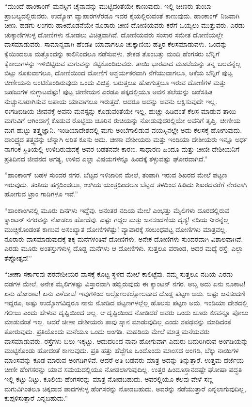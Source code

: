  “ಮುಂದೆ ಹಾಂಕಾಂಗ್ ಮನಸ್ಸಿಗೆ ಚೈನಾವನ್ನು ಮುಟ್ಟಿದಂತೆಯೇ ಕಾಣುವುದು. ಇಲ್ಲಿ ಚೀಣರು ತುಂಬಾ ಪ್ರಾಬಲ್ಯದಲ್ಲಿರುವರು. ಉದ್ಯೋಗ ವ್ಯಾಪಾರಗಳೆರಡೂ ಇವರ ಕೈಯಲ್ಲಿರುವಂತೆ ಕಾಣುವುದು. ಹಾಂಕಾಂಗ್ ನಿಜವಾಗಿ ಚೀಣ. ಹಡಗು ಲಂಗರು ಹಾಕಿದೊಡನೆಯೇ ನೂರಾರು ಚೀಣಿ ದೋಣಿಯವರು ಕರೆಗೆ ಒಯ್ಯಲು ಮುತ್ತುವರು. ಎರಡು ಚುಕ್ಕಾಣಿಗಳುಳ್ಳ ದೋಣಿಗಳು ನೋಡಲು ವಿಚಿತ್ರವಾಗಿವೆ. ದೋಣಿಯವರು ಸಂಸಾರ ಸಮೇತ ದೋಣಿಯಲ್ಲೇ ವಾಸಮಾಡುವರು. ಸಾಮಾನ್ಯವಾಗಿ ಹೆಂಡತಿ ಯಾವಾಗಲೂ ಚುಕ್ಕಾಣಿಯ ಹತ್ತಿರ ಕೆಲಸಮಾಡುವಳು. ಒಂದನ್ನು ಕೈಯಿಂದಲೂ ಮತ್ತೊಂದನ್ನು ಕಾಲಿನಿಂದಲೂ ನಡೆಸುವಳು. ಶೇಕಡ ತೊಂಬತ್ತು ಮಂದಿ ಹೆಂಗಸರು ಬೆನ್ನಿಗೆ ಕೈಕಾಲುಗಳನ್ನು ಇಳಿಬಿಟ್ಟಿರುವ ಮಗುವನ್ನು ಕಟ್ಟಿಕೊಂಡಿರುವರು. ತಾಯಿ ಭಾರವಾದ ಮೂಟೆಯನ್ನು ತನ್ನ ಬಲವನ್ನೆಲ್ಲ ಬಿಟ್ಟು ನೂಕುವಾಗಲೂ, ದೋಣಿಯಿಂದ ದೋಣಿಗೆ ಆಶ್ಚರ್ಯಕರವಾಗಿ ನೆಗೆಯುವಾಗಲೂ, ಆಕೆಯ ಬೆನ್ನಿಗೆ ಪುಟ್ಟ ಚೀಣೀಯನು ಅಂಟಿಕೊಂಡಿರುವುದು ಒಂದು ವಿಚಿತ್ರ. ಬರುತ್ತಲೂ ಹೋಗುತ್ತಲೂ ಇರುವ ದೋಣಿಗಳ ಮತ್ತು ಜಹಜುಗಳ ನುಗ್ಗಾಟವೆಷ್ಟು! ಪುಟ್ಟ ಚೀಣೀಯನ ಎರಡೂ ಪಕ್ಕದಲ್ಲಿಯೂ ಅವನ ತಲೆಯನ್ನು ಜಡೆಸಹಿತ ನುಚ್ಚುನೂರಾಗಿಸುವ ಅಪಾಯ ಯಾವಾಗಲೂ ಇರುತ್ತದೆ. ಆದರೂ ಅದನ್ನು ಅವನು ಲಕ್ಷಿಸುವುದೇ ಇಲ್ಲ. ಈ\break ಗಡಿಬಿಡಿಯ ಜೀವನಕ್ಕೆ ಅವನು ಮನಸ್ಸನ್ನು ಕೊಡುವಂತೆಯೇ ಇಲ್ಲ. ಹುಚ್ಚು ಹಿಡಿದಂತೆ ಕೆಲಸ ಮಾಡುವ ತಾಯಿ ಮಗುವಿಗೆ ಆಗಿಂದಾಗ್ಗೆ ಕೊಡುವ ರೊಟ್ಟಿಯ ಚೂರಿನ ರುಚಿಯನ್ನು ನೋಡುವುದರಲ್ಲಿಯೇ ಅವನಿಗೆ ತೃಪ್ತಿ. ಚೀಣೀಯ ಮಗ ಹುಟ್ಟು ತತ್ತ್ವಜ್ಞಾನಿ. ಇಂಡಿಯಾದೇಶದಲ್ಲಿ ಮಗು ಅಂಬೆಗಾಲಿಡುವ ವಯಸ್ಸಿನಲ್ಲೇ ಅದು ಕೆಲಸಕ್ಕೆ ಹೋಗುವುದು. ದಾರಿದ್ರ್ಯದ ತತ್ತ್ವವನ್ನು ಚೆನ್ನಾಗಿ ಅರಿತ ಕೂಸು ಅದು. ಚೀಣಾ ದೇಶೀಯರು ಮತ್ತು ಇಂಡಿಯಾ ದೇಶೀಯರು ಇನ್ನೂ ಅರ್ಧ ನಾಗರಿಕ ಸ್ಥಿತಿಯಲ್ಲಿ ಉಳಿದಿರುವುದಕ್ಕೆ ಅವರ ಬಡತನವೇ ಕಾರಣ. ಸಾಧಾರಣ ಹಿಂದೂ ಮತ್ತು ಚೀಣೀ ದೇಶೀಯನಿಗೆ ಪ್ರತಿದಿನದ ಜೀವನದ ಅಗತ್ಯ, ಉಳಿದ ಎಲ್ಲಾ ವಿಷಯಗಳನ್ನೂ ಹಿಂದಕ್ಕೆ ತಳ್ಳುವಷ್ಟು ಘೋರವಾಗಿದೆ.” 

”ಹಾಂಕಾಂಗ್ ಬಹಳ ಸುಂದರ ನಗರ. ಬೆಟ್ಟದ ಇಳಿಜಾರಿನ ಮೇಲೆ, ತಂಪಾಗಿ ಇರುವ ಶಿಖರದ ಮೇಲೆ ಪಟ್ಟಣ ಇರುವುದು. ತಂತಿಯ ಹಗ್ಗದಿಂದಲೂ, ಉಗಿಯ ಯಂತ್ರದಿಂದಲೂ ಬೆಟ್ಟದ ತಳದಿಂದ ಹಿಡಿದು ಶಿಖರದವರೆಗೆ ನೇರವಾಗಿ ಹೋಗುವ ಟ್ರಾಂ ಗಾಡಿಗಳೂ ಇವೆ.” 

 “ಹಾಂಕಾಂಗಿನಲ್ಲಿ ಮೂರು ದಿನಗಳು ಇದ್ದೆವು. ಅನಂತರ ನದಿಯ ಮೇಲೆ ಎಂಭತ್ತು ಮೈಲಿಗಳು ದೂರದಲ್ಲಿರುವ ಕ್ಯಾಂಟನ್ ನಗರವನ್ನು ನೋಡಲು ಹೋದೆವು. ಎಷ್ಟು ಗದ್ದಲ ಮತ್ತು ಜನಸಂದಣಿಯ ದೃಶ್ಯ! ನದಿಯ ನೀರನ್ನೆಲ್ಲ ಮುಚ್ಚಿಕೊಂಡಂತೆ ಕಾಣುವ ಅಸಂಖ್ಯಾತ ದೋಣಿಗಳೆಷ್ಟು! ವ್ಯಾಪಾರಕ್ಕೆ ಸಂಬಂಧಪಟ್ಟ ದೋಣಿಗಳು ಮಾತ್ರವಲ್ಲ. ನೂರಾರು ವಾಸಮಾಡುವುದಕ್ಕೆ ತಕ್ಕ ಮನೆಗಳಂತಿವೆ ದೋಣಿಗಳು. ಅನೇಕ ದೋಣಿಗಳು ಸುಂದರವಾಗಿ ವಿಶಾಲವಾಗಿವೆ. ಎರಡು ಮೂರು ಅಂತಸ್ತುಗಳುಳ್ಳ ದೊಡ್ಡ ಮನೆಗಳು ಆ ದೋಣಿಗಳು. ಸುತ್ತಲೂ ವರಾಂಡ, ಅದರ ಮಧ್ಯೆ ರಸ್ತೆ; ಎಲ್ಲಾ ತೆಪ್ಪೋತ್ಸವ!” 

 “ಚೀಣಾ ಸರ್ಕಾರವು ಪರದೇಶೀಯರ ವಾಸಕ್ಕೆ ಕೊಟ್ಟ ಸ್ಥಳದ ಮೇಲೆ ಕಾಲಿಟ್ಟೆವು. ನಮ್ಮ ಸುತ್ತಲೂ ನದಿಯ ಎರಡು ದಡಗಳ ಮೇಲೆ, ಅನೇಕ ಮೈಲಿಗಳಷ್ಟು ವಿಸ್ತಾರವಾಗಿ ಹಬ್ಬಿರುವುದು ಈ ಕ್ಯಾಂಟನ್ ನಗರ. ಅಬ್ಬ ಅದು ಏನು ನೂಕಾಟ! ಏನು ಹೋರಾಟ! ಏನು ಎಳೆದಾಟ! ಇವುಗಳಿಂದ ಅಲ್ಲೋಲಕಲ್ಲೋಲವಾದ ದೊಡ್ಡ ಪಟ್ಟಣ ಅದು. ಅಷ್ಟು ಜನಸಂದಣಿ ಇದ್ದರೂ, ಅಷ್ಟು ಉದ್ಯೋಗವಿದ್ದರೂ ನಾನು ನೋಡಿದ ಪಟ್ಟಣಗಳಲ್ಲೆಲ್ಲ ಹೊಲಸು ಪಟ್ಟಣ ಅದು. ಇಂಡಿಯಾ ದೇಶದಲ್ಲಿ ಗಲೀಜು ಎಂದು ಹೇಳುವ ದೃಷ್ಟಿಯಿಂದ ಅಲ್ಲ. ಆ ದೃಷ್ಟಿಯಿಂದ ನೋಡಿದರೆ ಅವರು ಒಂದು ಚೂರು ಕಸವನ್ನೂ ಪೋಲು ಮಾಡುವಂತೆ ಇಲ್ಲ. ಆದರೆ ಚೀಣಾ ದೇಶೀಯರು ತಾವು ಸ್ನಾನ ಮಾಡುವುದಿಲ್ಲ ಎಂದು ಶಪಥವನ್ನು ಮಾಡಿದಂತೆ ತೋರುವುದು. ಪ್ರತಿಯೊಂದು ಮನೆಯೂ ಒಂದು ಅಂಗಡಿ. ಮಹಡಿಯ ಮೇಲೆ ಮಾತ್ರ ಮನೆಯವರು ವಾಸಮಾಡುವರು. ರಸ್ತೆಗಳು ಬಲು ಇಕ್ಕಟ್ಟು. ಆದುದರಿಂದ ನಾವು ಹೋಗುವಾಗ ಎದುರು ಬದುರಿಗಿರುವ ಅಂಗಡಿಯನ್ನು ಮುಟ್ಟಿಕೊಂಡು ಹೋದಂತೆ ಕಾಣುವುದು. ಪ್ರತಿ ಹತ್ತು ಹೆಜ್ಜೆಗೂ ಒಂದೊಂದು ಮಾಂಸದ ಅಂಗಡಿ, ಬೆಕ್ಕು ನಾಯಿಗಳ ಮಾಂಸವನ್ನು ಕೂಡ ಮಾರುವ ಅಂಗಡಿಗಳಿವೆ. ಆದರೆ ಅತಿ ಬಡವರು ಮಾತ್ರ ಅದನ್ನು ತಿನ್ನುತ್ತಾರೆ. ಉತ್ತಮ ದರ್ಜೆಯ ಚೀಣೀ ಹೆಂಗಸರನ್ನು ಯಾವ ಸಮಯದಲ್ಲಿಯೂ ನೋಡಲಾಗುವುದಿಲ್ಲ. ಉತ್ತರ ಹಿಂದೂಸ್ತಾನದಷ್ಟೇ ಘೋಷಾ ಪದ್ಧತಿ ಇಲ್ಲಿ ಕಟ್ಟು ನಿಟ್ಟು. ಕೂಲಿಯ ಹೆಂಗಸರನ್ನು ಮಾತ್ರ ನೋಡಬಹುದು. ಅವರಲ್ಲಿಯೂ ಕೆಲವು ವೇಳೆ ಸಣ್ಣ ಮಗುವಿಗಿಂತಲೂ ಚಿಕ್ಕದಾದ ಪಾದಗಳುಳ್ಳ ಹೆಂಗಸರನ್ನು ನೋಡಬಹುದು. ಅವರನ್ನು ನಡೆಯುತ್ತಾರೆ ಎನ್ನಲಾಗುವುದಿಲ್ಲ, ಕುಪ್ಪಳಿಸುತ್ತಾರೆ ಎನ್ನಬಹುದು.” 

